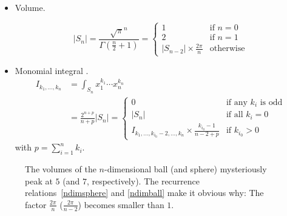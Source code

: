 \documentclass[draft]{scrartcl}
\begin{document}
\begin{itemize}
  \item Volume.

\begin{equation}\label{ndimball}
  |S_n|
  = \frac{\sqrt{\pi}^n}{\Gamma(\frac{n}{2}+1)}
  = \begin{cases}
     1&\text{if $n = 0$}\\
     2&\text{if $n = 1$}\\
     |S_{n-2}| \times \frac{2\pi}{n}&\text{otherwise}
  \end{cases}
\end{equation}

\item Monomial integral \cite{folland}.
\begin{align}\nonumber
  I_{k_1,\dots,k_n}
  &= \int_{S_n} x_1^{k_1}\cdots x_n^{k_n}\\
  &= \frac{2^{n + p}}{n + p} |S_n|
  =\begin{cases}
    0&\text{if any $k_i$ is odd}\\
    |S_n|&\text{if all $k_i=0$}\\
    I_{k_1,\dots,k_{i_0}-2,\dots,k_n} \times \frac{k_{i_0} - 1}{n - 2 + p}&\text{if $k_{i_0} > 0$}
  \end{cases}
\end{align}
with $p=\sum_{i=1}^n k_i$.
\end{itemize}

\begin{figure}
\centering

  \caption{The volumes of the $n$-dimensional ball (and sphere) mysteriously peak at $5$
  (and $7$, respectively). The recurrence relations~\eqref{ndimsphere} and
  \eqref{ndimball} make it obvious why: The factor $\frac{2\pi}{n}$ ($\frac{2\pi}{n-2}$)
  becomes smaller than $1$.}
\end{figure}
\end{document}
